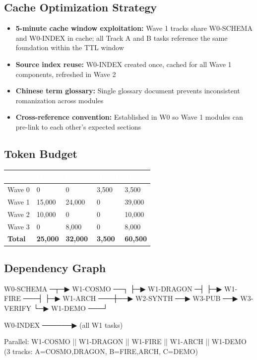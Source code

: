 \documentclass[11pt,letterpaper]{article}
\newcommand{\tableheader}[1]{\textbf{\sffamily\textcolor{white}{#1}}}
\begin{document}
\subsection{Cache Optimization Strategy}

\begin{itemize}[leftmargin=2em]
\item \textbf{5-minute cache window exploitation:} Wave 1 tracks share W0-SCHEMA and W0-INDEX in cache; all Track A and B tasks reference the same foundation within the TTL window
\item \textbf{Source index reuse:} W0-INDEX created once, cached for all Wave 1 components, refreshed in Wave 2
\item \textbf{Chinese term glossary:} Single glossary document prevents inconsistent romanization across modules
\item \textbf{Cross-reference convention:} Established in W0 so Wave 1 modules can pre-link to each other's expected sections
\end{itemize}

\subsection{Token Budget}

\begin{center}
\begin{tabularx}{\textwidth}{L{3cm}C{2cm}C{2cm}C{2cm}C{2cm}}
\toprule
{}
\tableheader{Wave} & \tableheader{Opus} & \tableheader{Sonnet} & \tableheader{Haiku} & \tableheader{Total} \\
\midrule
Wave 0 & 0 & 0 & 3,500 & 3,500 \\
Wave 1 & 15,000 & 24,000 & 0 & 39,000 \\
Wave 2 & 10,000 & 0 & 0 & 10,000 \\
Wave 3 & 0 & 8,000 & 0 & 8,000 \\
\midrule
\textbf{Total} & \textbf{25,000} & \textbf{32,000} & \textbf{3,500} & \textbf{60,500} \\
\bottomrule
\end{tabularx}
\end{center}

\subsection{Dependency Graph}

\begin{asciibox}
  W0-SCHEMA ─┬─▶ W1-COSMO ──┐
             ├─▶ W1-DRAGON ─┤
             ├─▶ W1-FIRE ───┤
             ├─▶ W1-ARCH ───┼──▶ W2-SYNTH ──▶ W3-PUB ──▶ W3-VERIFY
             └─▶ W1-DEMO ───┘

  W0-INDEX ──────▶ (all W1 tasks)

  Parallel: W1-COSMO || W1-DRAGON || W1-FIRE || W1-ARCH || W1-DEMO
  (3 tracks: A={COSMO,DRAGON}, B={FIRE,ARCH}, C={DEMO})
\end{asciibox}
\end{document}
